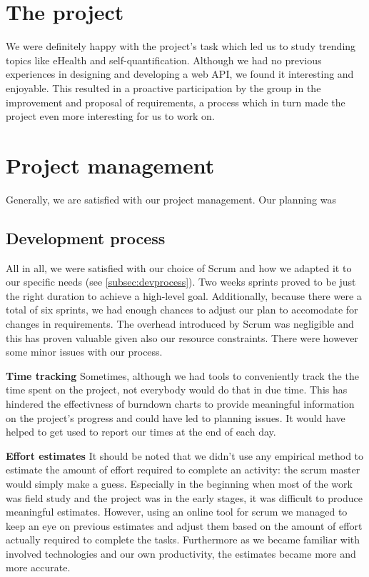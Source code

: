 \section{The project}
We were definitely happy with the project's task which led us to study trending topics
like eHealth and self-quantification. Although we had no previous experiences in designing and developing a web API,
we found it interesting and enjoyable. This resulted in a proactive participation by the group
in the improvement and proposal of requirements, a process which in turn made the project even more interesting
for us to work on.

\section{Project management}
Generally, we are satisfied with our project management.
Our planning was 


\subsection{Development process}
All in all, we were satisfied with our choice of Scrum and how we adapted
it to our specific needs (see \ref{subsec:devprocess}).
Two weeks sprints proved to be just the right duration to achieve
a high-level goal. Additionally, because there were a total of six sprints,
we had enough chances to adjust our plan to accomodate for changes in requirements.
The overhead introduced by Scrum was negligible and this has proven valuable
given also our resource constraints. There were however some minor issues with our process.

\textbf{Time tracking}\newline
Sometimes, although we had tools to conveniently track the the time spent on the project,
not everybody would do that in due time. This has hindered the effectivness of burndown charts
to provide meaningful information on the project's progress and could have led to planning issues.
It would have helped to get used to report our times at the end of each day.

\textbf{Effort estimates}\newline
It should be noted that we didn't use any empirical method to estimate the amount of effort
required to complete an activity: the scrum master would simply make a guess.
Especially in the beginning when most of the work was field study and the project
was in the early stages, it was difficult to produce meaningful estimates.
However, using an online tool for scrum we managed to keep an eye on previous
estimates and adjust them based on the amount of effort actually required to complete the tasks.
Furthermore as we became familiar with involved technologies and our own productivity,
the estimates became more and more accurate.

